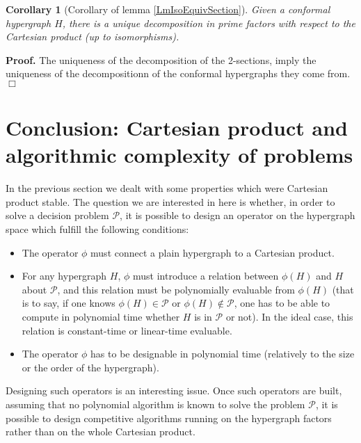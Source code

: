 \documentclass[copyright]{eptcs}
\def\Proof{{\noindent \bf Proof. }}
\def\QED{{\hfill $\Box$ \medskip}}
\newtheorem{Cor}{Corollary}
\newcommand{\mc}[1]{\mathcal{#1}}
\newcommand{\chg}[1]{{#1}}
\begin{document}
\chg{
\begin{Cor}[Corollary of lemma \ref{LmIsoEquivSection}]
 Given a conformal hypergraph $H$, there is a unique decomposition in prime factors with respect to the Cartesian product (up to isomorphisms).
\end{Cor}
\Proof
 The uniqueness of the decomposition of the 2-sections, imply the uniqueness of the decompositionn of the conformal hypergraphs they come from. \QED}




\section{Conclusion: Cartesian product and algorithmic complexity of problems}
In the previous section we dealt with some properties which were Cartesian product stable. The question we are interested in here is whether, in order to solve a decision problem $\mathcal P$, it is possible to design an operator on the hypergraph space which fulfill the following conditions:
\begin{itemize}
 \item The operator $\phi$ must connect a plain hypergraph to a Cartesian product.
 \item For any hypergraph $H$, $\phi$ must introduce a relation between $\phi (H)$ and $H$ about $\mc P$, and this relation must be polynomially evaluable from $\phi (H)$ (that is to say, if one knows $\phi (H) \in \mc P$ or $\phi (H) \notin \mc P$, one has to be able to compute in polynomial time whether $H$ is in $\mc P$ or not). In the ideal case, this relation is constant-time or linear-time evaluable.
 \item The operator $\phi$ has to be designable in polynomial time (relatively to the size or the order of the hypergraph).
\end{itemize}
Designing such operators is an interesting issue. Once such operators are built, assuming that no polynomial algorithm is known to solve the problem $\mc P$, it is possible to design competitive algorithms running on the hypergraph factors rather than on the whole Cartesian product.\\





\end{document}
